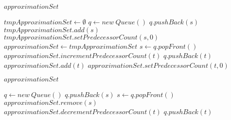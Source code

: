 \begin{algorithm}
\caption{$ eliminateNoAccepting(approximationSet) $}
\begin{algorithmic}[1]
\REQUIRE $ approximationSet $

\STATE $ tmpApproximationSet \leftarrow \emptyset $
\STATE $ q \leftarrow new\ Queue() $
    \STATE $ q.pushBack(s) $
    \STATE $ tmpApproximationSet.add(s) $
    \STATE $ tmpApproximationSet.setPredecessorCount(s,0) $
  \ENDIF
\ENDFOR
\STATE $ approximationSet \leftarrow tmpApproximationSet $
  \STATE $ s \leftarrow q.popFront() $
      \STATE $ approximationSet.incrementPredecessorCount(t) $
    \ELSE
      \STATE $ q.pushBack(t) $
      \STATE $ approximationSet.add(t) $
      \STATE $ approximationSet.setPredecessorCount(t,0) $
    \ENDIF
  \ENDFOR
\ENDWHILE
\end{algorithmic}
\end{algorithm}


\begin{algorithm}
\caption{$ eliminateNoPredecessors(approximationSet) $}
\begin{algorithmic}[1]
\REQUIRE $ approximationSet $

\STATE $ q \leftarrow new\ Queue() $
    \STATE $ q.pushBack(s) $
  \ENDIF
\ENDFOR
{}
  \STATE $ s \leftarrow q.popFront() $
  \STATE $ approximationSet.remove(s) $
    \STATE $ approximationSet.decrementPredecessorCount(t) $
      \STATE $ q.pushBack(t) $
    \ENDIF
  \ENDFOR
\ENDWHILE
\end{algorithmic}
\end{algorithm}


